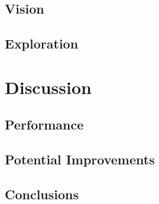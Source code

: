 \documentclass[conference]{IEEEtran}
\begin{document}
\subsection{Vision}
\subsection{Exploration}
\section{Discussion}
\subsection{Performance}
\subsection{Potential Improvements}
\subsection{Conclusions}



\end{document}
